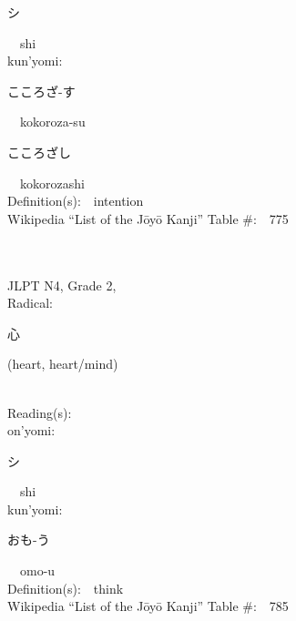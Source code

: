 \begin{multicols}{2}
{\hspace*{2em}}{\begin{CJK}{UTF8}{min} シ \end{CJK}}\ \ shi\ \ \\
{\hspace*{1em}}kun'yomi:\ \ \\
{\hspace*{2em}}{\begin{CJK}{UTF8}{min} こころざ-す \end{CJK}}\ \ kokoroza-su\ \ \\
{\hspace*{2em}}{\begin{CJK}{UTF8}{min} こころざし \end{CJK}}\ \ kokorozashi\ \ \\
Definition(s):\ \ intention \\
Wikipedia ``List of the J\=oy\=o Kanji'' Table \#:\ \ 775 \\
\ \ \\
{\fontsize{34pt}{40pt}  }\ \ \\  %
{JLPT N4, Grade 2, \\Radical:\ \ {\begin{CJK}{UTF8}{min} 心 \end{CJK}} (heart, heart/mind) } \\
Reading(s):\ \ \\
{\hspace*{1em}}on'yomi:\ \ \\
{\hspace*{2em}}{\begin{CJK}{UTF8}{min} シ \end{CJK}}\ \ shi\ \ \\
{\hspace*{1em}}kun'yomi:\ \ \\
{\hspace*{2em}}{\begin{CJK}{UTF8}{min} おも-う \end{CJK}}\ \ omo-u\ \ \\
Definition(s):\ \ think \\
Wikipedia ``List of the J\=oy\=o Kanji'' Table \#:\ \ 785 \\
\ \ \\
{\fontsize{34pt}{40pt}  }\ \ \\  %

\end{multicols}
